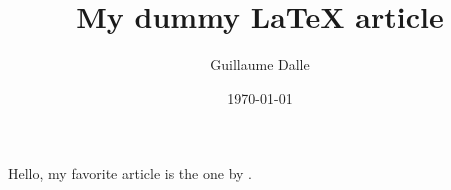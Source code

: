\documentclass{article}
\title{My dummy LaTeX article}
\author{Guillaume Dalle}
\date{\today}
\begin{document}
\maketitle

Hello, my favorite article is the one by \textcite{dalleLearningCombinatorialOptimization2022}. 

\printbibliography
\end{document}
